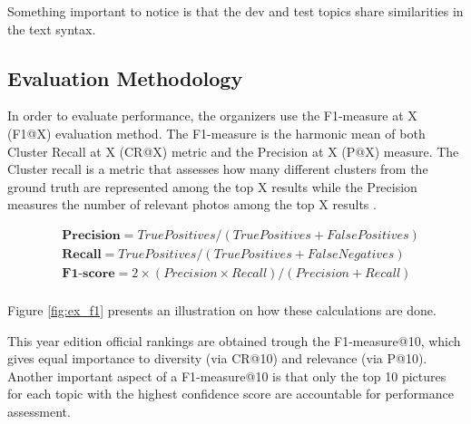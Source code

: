     Something important to notice is that the dev and test topics share similarities in the text syntax. 

        \subsection{Evaluation Methodology}
        \label{sec:eval}
        
        
        In order to evaluate performance, the organizers use the F1-measure at X (F1@X) evaluation method. The F1-measure is the harmonic mean of both Cluster Recall at X (CR@X) metric and the Precision at X (P@X) measure. The Cluster recall is a metric that assesses how many different clusters from the ground truth are represented among the top X results  while the Precision measures the number of  relevant photos among the top X results \cite{Ninh2020}.


     

        \begin{align*}
            &\textbf{Precision}  =  True Positives / (True Positives + False Positives) \\ 
            &\textbf{Recall}  =  True Positives / (True Positives + False Negatives) \\ 
            &\textbf{F1-score}  =  2\times(Precision \times Recall)/(Precision + Recall) \\ 
        \end{align*}
       
        
        Figure \ref{fig:ex_f1} presents an illustration on how these calculations are done.

        This year edition official rankings are obtained trough the F1-measure@10, which gives equal importance to diversity (via CR@10) and relevance (via P@10). Another important aspect of a F1-measure@10 is that only the top 10 pictures for each topic with the highest confidence score are accountable for performance assessment.




